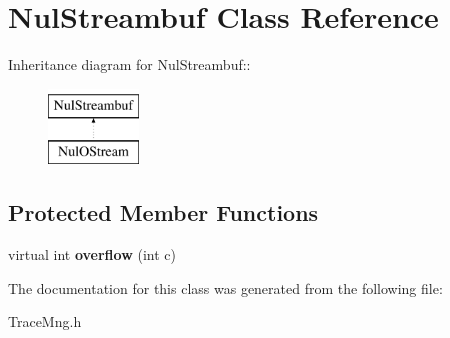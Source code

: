\hypertarget{classNulStreambuf}{
\section{NulStreambuf Class Reference}
\label{classNulStreambuf}
}
Inheritance diagram for NulStreambuf::\begin{figure}[H]
\begin{center}
\leavevmode
\includegraphics[height=2cm]{classNulStreambuf}
\end{center}
\end{figure}
\subsection*{Protected Member Functions}
\begin{DoxyCompactItemize}
\item 
\hypertarget{classNulStreambuf_aeaba3d336743d4c7bd8a2ca254dfcac4}{
virtual int {\bfseries overflow} (int c)}
\label{classNulStreambuf_aeaba3d336743d4c7bd8a2ca254dfcac4}

\end{DoxyCompactItemize}


The documentation for this class was generated from the following file:\begin{DoxyCompactItemize}
\item 
TraceMng.h\end{DoxyCompactItemize}
